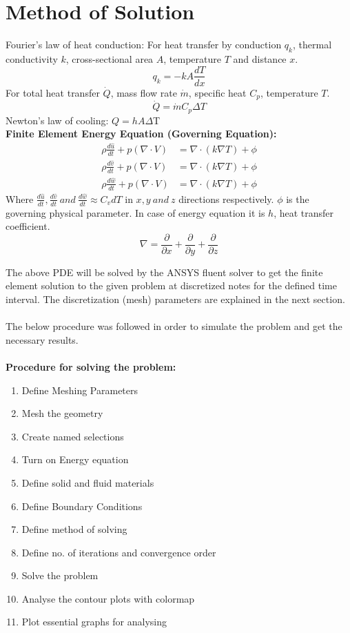 \documentclass{article}
\begin{document}
\section{Method of Solution}
    Fourier's law of heat conduction: For heat transfer by conduction $q_k$, thermal conductivity $k$, cross-sectional area $A$, temperature $T$ and distance $x$.
    $$q_k = -kA\frac{dT}{dx}$$
    For total heat transfer $\dot{Q}$, mass flow rate $\dot{m}$, specific heat $C_p$, temperature $T$.
    $$\dot{Q}=\dot{m}C_p\Delta T $$
    Newton's law of cooling: $Q=hA\Delta$T\\
    \textbf{Finite Element Energy Equation (Governing Equation): }
    \begin{align*}
        \rho \frac{d\hat{u}}{dt}+p(\nabla \cdot V) &= \nabla\cdot(k\nabla T)+\phi\\
        \rho \frac{d\hat{v}}{dt}+p(\nabla \cdot V) &= \nabla\cdot(k\nabla T)+\phi\\
        \rho \frac{d\hat{w}}{dt}+p(\nabla \cdot V) &= \nabla\cdot(k\nabla T)+\phi
    \end{align*}
    Where $\frac{d\hat{u}}{dt},\frac{d\hat{v}}{dt}\ and\ \frac{d\hat{w}}{dt} \approx C_vdT$  in $x,y\ and\ z$ directions respectively. $\phi$ is the governing physical parameter. In case of energy equation it is $h$, heat transfer coefficient. 
    $$\nabla = \frac{\partial{}}{\partial{x}}+\frac{\partial{}}{\partial{y}}+\frac{\partial{}}{\partial{z}}$$
    
    The above PDE will be solved by the ANSYS fluent solver to get the finite element solution to the given problem at discretized notes for the defined time interval. The discretization (mesh) parameters are explained in the next section. \\
    \vspace{1.5cm}\\
    The below procedure was followed in order to simulate the problem and get the necessary results. \\
    \vspace{0.5cm}\\
    \textbf{Procedure for solving the problem:}
    \begin{enumerate}
        \item Define Meshing Parameters
        \item Mesh the geometry
        \item Create named selections
        \item Turn on Energy equation
        \item Define solid and fluid materials
        \item Define Boundary Conditions
        \item Define method of solving 
        \item Define no. of iterations and convergence order
        \item Solve the problem
        \item Analyse the contour plots with colormap
        \item Plot essential graphs for analysing 
    \end{enumerate}
\newpage
\end{document}
